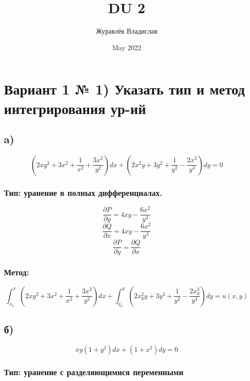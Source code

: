 \documentclass[a4paper]{article}
\title{DU 2}
\author{Журавлёв Владислав}
\date{May 2022}
\begin{document}
\maketitle

\section*{Вариант 1 \newline № 1) Указать тип и метод интегрирования ур-ий}
\subsection*{a)}
\begin{equation*}
(2xy^2+3x^2+\frac{1}{x^2}+\frac{3x^2}{y^2}) dx+(2x^2y+3y^2+\frac{1}{y^2}-\frac{2x^3}{y^3}) dy = 0
\end{equation*}
\subsubsection*{Тип: уранение в полных дифференциалах.}

\begin{equation*}
\frac{\partial P}{\partial y}=4xy-\frac{6x^2}{y^3}
\end{equation*}
\begin{equation*}
\frac{\partial Q}{\partial x}=4xy-\frac{6x^2}{y^3}
\end{equation*}
\begin{equation*}
\frac{\partial P}{\partial y}=\frac{\partial Q}{\partial x}
\end{equation*}

\subsubsection*{Метод:}
\begin{equation*}
\int_{x_0}^{x}\left(2xy^2+3x^2+\frac{1}{x^2}+\frac{3x^2}{y^2}\right)dx+\int_{y_0}^{y}\left(2x_0^2y+3y^2+\frac{1}{y^2}-\frac{2x_0^3}{y^3}\right)dy=u(x,y)
\end{equation*}

\subsection*{б)}
\begin{equation*}
xy(1+y^2)dx + (1+x^2)dy = 0
\end{equation*}
\subsubsection*{Тип: уранение с разделяющимися переменными}
\end{document}
